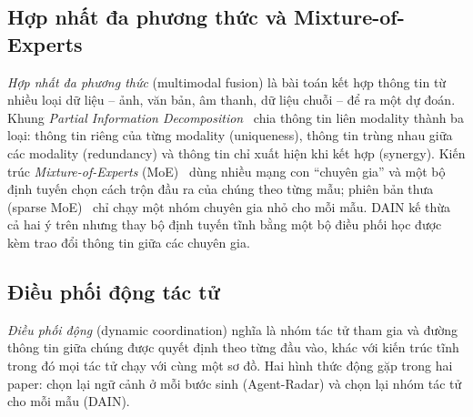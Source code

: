 \subsection{Hợp nhất đa phương thức và Mixture-of-Experts}
\emph{Hợp nhất đa phương thức} (multimodal fusion) là bài toán kết hợp thông tin từ nhiều loại dữ liệu -- ảnh, văn bản, âm thanh, dữ liệu chuỗi -- để ra một dự đoán. Khung \emph{Partial Information Decomposition}~\cite{liang2023pid} chia thông tin liên modality thành ba loại: thông tin riêng của từng modality (uniqueness), thông tin trùng nhau giữa các modality (redundancy) và thông tin chỉ xuất hiện khi kết hợp (synergy). Kiến trúc \emph{Mixture-of-Experts} (MoE)~\cite{jacobs1991adaptive} dùng nhiều mạng con ``chuyên gia'' và một bộ định tuyến chọn cách trộn đầu ra của chúng theo từng mẫu; phiên bản thưa (sparse MoE)~\cite{shazeer2017outrageously} chỉ chạy một nhóm chuyên gia nhỏ cho mỗi mẫu. DAIN kế thừa cả hai ý trên nhưng thay bộ định tuyến tĩnh bằng một bộ điều phối học được kèm trao đổi thông tin giữa các chuyên gia.

\subsection{Điều phối động tác tử}
\emph{Điều phối động} (dynamic coordination) nghĩa là nhóm tác tử tham gia và đường thông tin giữa chúng được quyết định theo từng đầu vào, khác với kiến trúc tĩnh trong đó mọi tác tử chạy với cùng một sơ đồ. Hai hình thức động gặp trong hai paper: chọn lại ngữ cảnh ở mỗi bước sinh (Agent-Radar) và chọn lại nhóm tác tử cho mỗi mẫu (DAIN).
